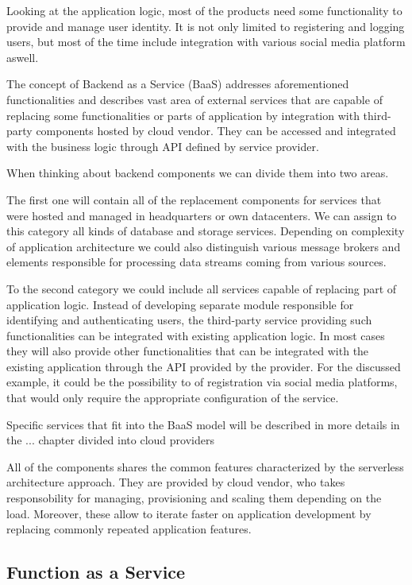 Looking at the application logic, most of the products need some functionality to provide and manage user identity. It is not only limited to registering and logging users, but most of the time include integration with various social media platform aswell. 

The concept of Backend as a Service (BaaS) addresses aforementioned functionalities and describes vast area of external services that are capable of replacing some functionalities or parts of application by integration with third-party components hosted by cloud vendor. They can be accessed and integrated with the business logic through API defined by service provider. 

When thinking about backend components we can divide them into two areas. 

The first one will contain all of the replacement components for services that were hosted and managed in headquarters or own datacenters. We can assign to this category all kinds of database and storage services. Depending on complexity of application architecture we could also distinguish various message brokers and elements responsible for processing data streams coming from various sources.

To the second category we could include all services capable of replacing part of application logic. Instead of developing separate module responsible for identifying and authenticating users, the third-party service providing such functionalities can be integrated with existing application logic.  In most cases they will also provide other functionalities that can be integrated with the existing application through the API provided by the provider. For the discussed example, it could be the possibility to of registration via social media platforms, that would only require the appropriate configuration of the service. 

Specific services that fit into the BaaS model will be described in more details in the ... chapter divided into cloud providers

All of the components shares the common features characterized by the serverless architecture approach. They are provided by cloud vendor, who takes responsobility for managing, provisioning and scaling them depending on the load. Moreover, these allow to iterate faster on application development by replacing commonly repeated application features.

\subsection{Function as a Service}

